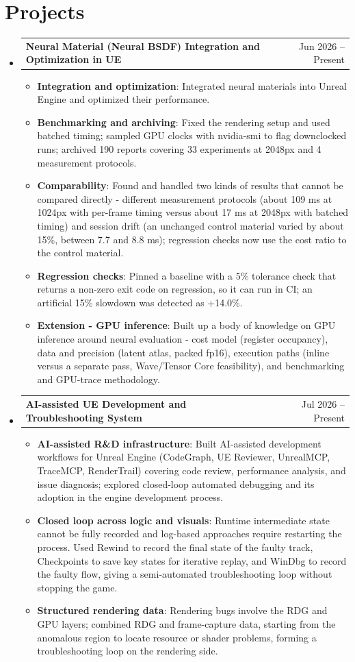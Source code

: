 \documentclass[a4paper,11pt]{article}
\makeatletter
\newcommand{\resumeItem}[1]{\item\small{#1 \vspace{-2pt}}}
\newcommand{\resumeProjectHeading}[2]{
    \item
    \begin{tabular*}{0.97\textwidth}{l@{\extracolsep{\fill}}r}
      \small#1 & #2 \\
    \end{tabular*}\vspace{-7pt}
}
\newcommand{\resumeSubHeadingListStart}{\begin{itemize}[leftmargin=0.15in, label={}]}
\newcommand{\resumeSubHeadingListEnd}{\end{itemize}}
\newcommand{\resumeItemListStart}{\begin{itemize}}
\newcommand{\resumeItemListEnd}{\end{itemize}\vspace{-5pt}}
\makeatother
\begin{document}
\section{Projects}
  \resumeSubHeadingListStart
    \resumeProjectHeading
      {\textbf{Neural Material (Neural BSDF) Integration and Optimization in UE}}{Jun 2026 -- Present}
      \resumeItemListStart
        \resumeItem{\textbf{Integration and optimization}: Integrated neural materials into Unreal Engine and optimized their performance.}
        \resumeItem{\textbf{Benchmarking and archiving}: Fixed the rendering setup and used batched timing; sampled GPU clocks with nvidia-smi to flag downclocked runs; archived 190 reports covering 33 experiments at 2048px and 4 measurement protocols.}
        \resumeItem{\textbf{Comparability}: Found and handled two kinds of results that cannot be compared directly - different measurement protocols (about 109 ms at 1024px with per-frame timing versus about 17 ms at 2048px with batched timing) and session drift (an unchanged control material varied by about 15\%, between 7.7 and 8.8 ms); regression checks now use the cost ratio to the control material.}
        \resumeItem{\textbf{Regression checks}: Pinned a baseline with a 5\% tolerance check that returns a non-zero exit code on regression, so it can run in CI; an artificial 15\% slowdown was detected as +14.0\%.}
        \resumeItem{\textbf{Extension - GPU inference}: Built up a body of knowledge on GPU inference around neural evaluation - cost model (register occupancy), data and precision (latent atlas, packed fp16), execution paths (inline versus a separate pass, Wave/Tensor Core feasibility), and benchmarking and GPU-trace methodology.}
      \resumeItemListEnd
    \resumeProjectHeading
      {\textbf{AI-assisted UE Development and Troubleshooting System}}{Jul 2026 -- Present}
      \resumeItemListStart
        \resumeItem{\textbf{AI-assisted R\&D infrastructure}: Built AI-assisted development workflows for Unreal Engine (CodeGraph, UE Reviewer, UnrealMCP, TraceMCP, RenderTrail) covering code review, performance analysis, and issue diagnosis; explored closed-loop automated debugging and its adoption in the engine development process.}
        \resumeItem{\textbf{Closed loop across logic and visuals}: Runtime intermediate state cannot be fully recorded and log-based approaches require restarting the process. Used Rewind to record the final state of the faulty track, Checkpoints to save key states for iterative replay, and WinDbg to record the faulty flow, giving a semi-automated troubleshooting loop without stopping the game.}
        \resumeItem{\textbf{Structured rendering data}: Rendering bugs involve the RDG and GPU layers; combined RDG and frame-capture data, starting from the anomalous region to locate resource or shader problems, forming a troubleshooting loop on the rendering side.}
      \resumeItemListEnd
  \resumeSubHeadingListEnd
\end{document}
